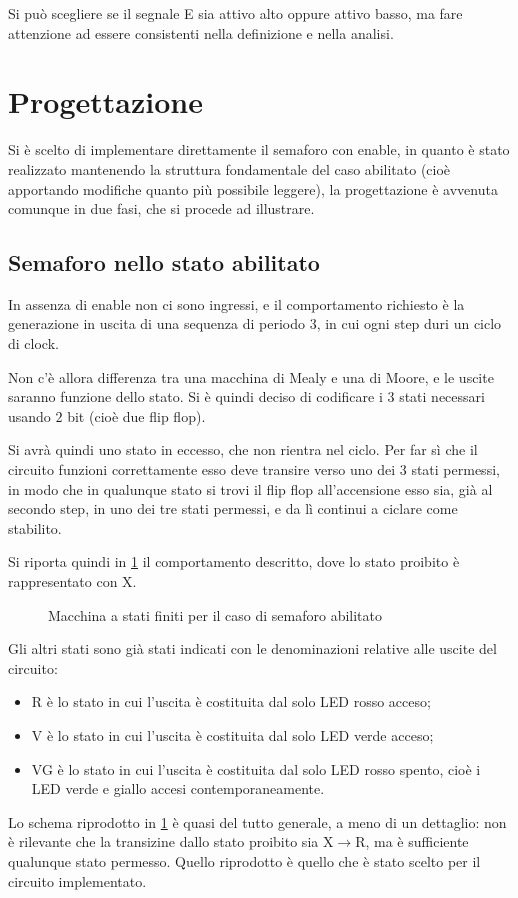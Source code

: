 \documentclass[a4paper,10pt]{article}
\begin{document}
Si può scegliere se il segnale E sia attivo alto oppure attivo basso, ma fare attenzione ad essere consistenti nella definizione e nella analisi.

\section{Progettazione}

Si è scelto di implementare direttamente il semaforo con enable, in quanto è stato realizzato mantenendo la struttura fondamentale del caso abilitato (cioè apportando modifiche quanto più possibile leggere), la progettazione è avvenuta comunque in due fasi, che si procede ad illustrare.

\subsection{Semaforo nello stato abilitato}

In assenza di enable non ci sono ingressi, e il comportamento richiesto è la generazione in uscita di una sequenza di periodo $ 3 $, in cui ogni step duri un ciclo di clock.

Non c'è allora differenza tra una macchina di Mealy e una di Moore, e le uscite saranno funzione dello stato. Si è quindi deciso di codificare i $ 3 $ stati necessari usando $ 2 $ bit (cioè due flip flop). 

Si avrà quindi uno stato in eccesso, che non rientra nel ciclo. Per far sì che il circuito funzioni correttamente esso deve transire verso uno dei $ 3 $ stati permessi, in modo che in qualunque stato si trovi il flip flop all'accensione esso sia, già al secondo step, in uno dei tre stati permessi, e da lì continui a ciclare come stabilito.

Si riporta quindi in \cref{fig:wEN} il comportamento descritto, dove lo stato proibito è rappresentato con X.

\begin{figure}[H]
	\centering
	
	\caption{Macchina a stati finiti per il caso di semaforo abilitato}
	\label{fig:wEN}
\end{figure}

Gli altri stati sono già stati indicati con le denominazioni relative alle uscite del circuito:
\begin{itemize}
	\item R è lo stato in cui l'uscita è costituita dal solo LED rosso acceso;
	\item V è lo stato in cui l'uscita è costituita dal solo LED verde acceso;
	\item VG è lo stato in cui l'uscita è costituita dal solo LED rosso spento, cioè i LED verde e giallo accesi contemporaneamente.
\end{itemize}
Lo schema riprodotto in \cref{fig:wEN} è quasi del tutto generale, a meno di un dettaglio: non è rilevante che la transizine dallo stato proibito sia X$ \rightarrow $R, ma è sufficiente qualunque stato permesso.
Quello riprodotto è quello che è stato scelto per il circuito implementato.
\end{document}
